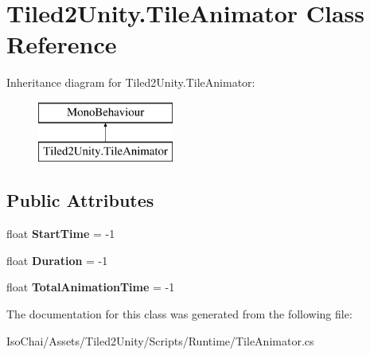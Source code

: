 \hypertarget{class_tiled2_unity_1_1_tile_animator}{}\section{Tiled2\+Unity.\+Tile\+Animator Class Reference}
\label{class_tiled2_unity_1_1_tile_animator}
Inheritance diagram for Tiled2\+Unity.\+Tile\+Animator\+:\begin{figure}[H]
\begin{center}
\leavevmode
\includegraphics[height=2.000000cm]{class_tiled2_unity_1_1_tile_animator}
\end{center}
\end{figure}
\subsection*{Public Attributes}
\begin{DoxyCompactItemize}
\item 
\mbox{\label{class_tiled2_unity_1_1_tile_animator_ac96cabb3b772e367d4141dba085a459b}} 
float {\bfseries Start\+Time} = -\/1
\item 
\mbox{\label{class_tiled2_unity_1_1_tile_animator_a36a9be6b0075d46cd283eba6ed110f02}} 
float {\bfseries Duration} = -\/1
\item 
\mbox{\label{class_tiled2_unity_1_1_tile_animator_abfc3c29538506faf9f4f8ef8bd438839}} 
float {\bfseries Total\+Animation\+Time} = -\/1
\end{DoxyCompactItemize}


The documentation for this class was generated from the following file\+:\begin{DoxyCompactItemize}
\item 
Iso\+Chai/\+Assets/\+Tiled2\+Unity/\+Scripts/\+Runtime/Tile\+Animator.\+cs\end{DoxyCompactItemize}

